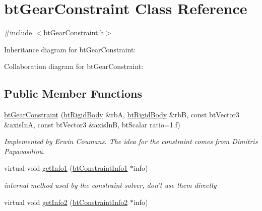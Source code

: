 \hypertarget{classbt_gear_constraint}{\section{bt\+Gear\+Constraint Class Reference}
\label{classbt_gear_constraint}
}


{\ttfamily \#include $<$bt\+Gear\+Constraint.\+h$>$}



Inheritance diagram for bt\+Gear\+Constraint\+:


Collaboration diagram for bt\+Gear\+Constraint\+:
\subsection*{Public Member Functions}
\begin{DoxyCompactItemize}
\item 
\hypertarget{classbt_gear_constraint_aee33fd1dac22b6f0323757057204e891}{\hyperlink{classbt_gear_constraint_aee33fd1dac22b6f0323757057204e891}{bt\+Gear\+Constraint} (\hyperlink{classbt_rigid_body}{bt\+Rigid\+Body} \&rb\+A, \hyperlink{classbt_rigid_body}{bt\+Rigid\+Body} \&rb\+B, const bt\+Vector3 \&axis\+In\+A, const bt\+Vector3 \&axis\+In\+B, bt\+Scalar ratio=1.f)}\label{classbt_gear_constraint_aee33fd1dac22b6f0323757057204e891}

\begin{DoxyCompactList}\small\item\em Implemented by Erwin Coumans. The idea for the constraint comes from Dimitris Papavasiliou. \end{DoxyCompactList}\item 
\hypertarget{classbt_gear_constraint_ae8e7d953740bff99eca4441b5d9c7eb1}{virtual void \hyperlink{classbt_gear_constraint_ae8e7d953740bff99eca4441b5d9c7eb1}{get\+Info1} (\hyperlink{structbt_constraint_info1}{bt\+Constraint\+Info1} $\ast$info)}\label{classbt_gear_constraint_ae8e7d953740bff99eca4441b5d9c7eb1}

\begin{DoxyCompactList}\small\item\em internal method used by the constraint solver, don't use them directly \end{DoxyCompactList}\item 
\hypertarget{classbt_gear_constraint_ae1c6770b8835458389ca7ae3ce7dfb05}{virtual void \hyperlink{classbt_gear_constraint_ae1c6770b8835458389ca7ae3ce7dfb05}{get\+Info2} (\hyperlink{structbt_constraint_info2}{bt\+Constraint\+Info2} $\ast$info)}\label{classbt_gear_constraint_ae1c6770b8835458389ca7ae3ce7dfb05}


\end{DoxyCompactItemize}
